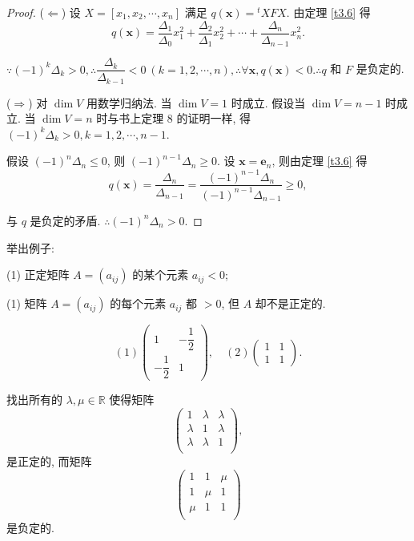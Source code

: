 \documentclass{ctexart}
\begin{document}
\begin{proof}
    ($\Leftarrow$) 设 $X=[x_1,x_2,\cdots,x_n]$ 满足 $q(\boldsymbol{x})={}^tXFX$. 由定理 \ref{t3.6} 得
    \[q(\boldsymbol{x})=\dfrac{\Delta_1}{\Delta_0}x_1^2+\dfrac{\Delta_2}{\Delta_1}x_2^2+\cdots+\dfrac{\Delta_n}{\Delta_{n-1}}x_n^2.\]

    $\because(-1)^k\Delta_k>0,\therefore\dfrac{\Delta_k}{\Delta_{k-1}}<0\ (k=1,2,\cdots,n),\therefore\forall\boldsymbol{x},q(\boldsymbol{x})<0.\therefore q$ 和 $F$ 是负定的.

    ($\Rightarrow$) 对 $\dim V$ 用数学归纳法. 当 $\dim V=1$ 时成立. 假设当 $\dim V=n-1$ 时成立. 当 $\dim V=n$ 时与书上定理 8 的证明一样, 得 $(-1)^k\Delta_k>0,k=1,2,\cdots,n-1$.

    假设 $(-1)^n\Delta_n\leq0$, 则 $(-1)^{n-1}\Delta_n\geq0$. 设 $\boldsymbol{x}=\boldsymbol{e}_n$, 则由定理 \ref{t3.6} 得
    \[q(\boldsymbol{x})=\dfrac{\Delta_n}{\Delta_{n-1}}=\dfrac{(-1)^{n-1}\Delta_n}{(-1)^{n-1}\Delta_{n-1}}\geq0,\]

    与 $q$ 是负定的矛盾. $\therefore(-1)^n\Delta_n>0$.
\end{proof}
\begin{exercise}%
    举出例子:
    
    (1) 正定矩阵 $A=(a_{ij})$ 的某个元素 $a_{ij}<0$;

    (1) 矩阵 $A=(a_{ij})$ 的每个元素 $a_{ij}$ 都 $>0$, 但 $A$ 却不是正定的.
\end{exercise}
\begin{solution}
    \[(1)\begin{pmatrix}
        1 & -\dfrac{1}{2} \\
        -\dfrac{1}{2} & 1
    \end{pmatrix},\quad (2)\begin{pmatrix}
        1 & 1 \\
        1 & 1
    \end{pmatrix}.\]
\end{solution}
\begin{exercise}%
    找出所有的 $\lambda,\mu\in\mathbb{R}$ 使得矩阵
    \[\begin{pmatrix}
        1 & \lambda & \lambda \\
        \lambda & 1 & \lambda \\
        \lambda & \lambda & 1 \\
    \end{pmatrix},\]
    是正定的, 而矩阵
    \[\begin{pmatrix}
        1 & 1 & \mu \\
        1 & \mu & 1 \\
        \mu & 1 & 1 \\
    \end{pmatrix}\]
    是负定的.
\end{exercise}
\end{document}
